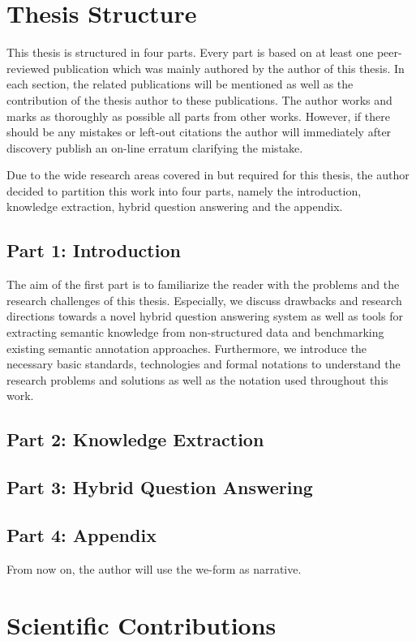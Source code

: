 \section{Thesis Structure}

This thesis is structured in four parts.
Every part is based on at least one peer-reviewed publication which was mainly authored by the author of this thesis.
In each section, the related publications will be mentioned as well as the contribution of the thesis author to these publications. 
The author works and marks as thoroughly as possible all parts from other works. 
However, if there should be any mistakes or left-out citations the author will immediately after discovery publish an on-line erratum clarifying the mistake. 

Due to the wide research areas covered in but required for this thesis, the author decided to partition this work into four parts, namely the introduction, knowledge extraction, hybrid question answering and the appendix. 

\subsection{Part 1: Introduction}
The aim of the first part is to familiarize the reader with the problems and the research challenges of this thesis. 
Especially, we discuss drawbacks and research directions towards a novel hybrid question answering system as well as tools for extracting semantic knowledge from non-structured data and benchmarking existing semantic annotation approaches.
Furthermore, we introduce the necessary basic standards, technologies and formal notations to understand the research problems and solutions as well as the notation used throughout this work.

\subsection{Part 2: Knowledge Extraction}



\subsection{Part 3: Hybrid Question Answering}

\subsection{Part 4: Appendix}

From now on, the author will use the we-form as narrative.

\section{Scientific Contributions}


